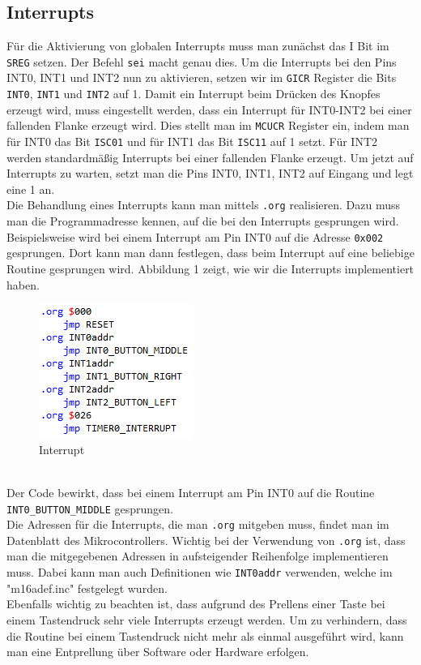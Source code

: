 \documentclass[]{article}
\begin{document}
\subsection{Interrupts}
Für die Aktivierung von globalen Interrupts muss man zunächst das I Bit im \texttt{SREG} setzen. Der Befehl \texttt{sei} macht genau dies. Um die Interrupts bei den Pins INT0, INT1 und INT2 nun zu aktivieren, setzen wir im \texttt{GICR} Register die Bits \texttt{INT0}, \texttt{INT1} und \texttt{INT2} auf 1. Damit ein Interrupt beim Drücken des Knopfes erzeugt wird, muss eingestellt werden, dass ein Interrupt für INT0-INT2 bei einer fallenden Flanke erzeugt wird. Dies stellt man im \texttt{MCUCR} Register ein, indem man für INT0 das Bit \texttt{ISC01} und für INT1 das Bit \texttt{ISC11} auf 1 setzt. Für INT2 werden standardmäßig Interrupts bei einer fallenden Flanke erzeugt. Um jetzt auf Interrupts zu warten, setzt man die Pins INT0, INT1, INT2 auf Eingang und legt eine 1 an. 
\\Die Behandlung eines Interrupts kann man mittels \texttt{.org} realisieren. Dazu muss man die Programmadresse kennen, auf die bei den Interrupts gesprungen wird. Beispielsweise wird bei einem Interrupt am Pin INT0 auf die Adresse \texttt{0x002} gesprungen. Dort kann man dann festlegen, dass beim Interrupt auf eine beliebige Routine gesprungen wird. Abbildung 1 zeigt, wie wir die Interrupts implementiert haben.
\begin{figure}[h]
	\centering
	\includegraphics[width=0.3\columnwidth]{Interrupt.png}
	\caption{Interrupt}
\end{figure}
\\Der Code bewirkt, dass bei einem Interrupt am Pin INT0 auf die Routine \texttt{INT0\_BUTTON\_MIDDLE} gesprungen.
\\Die Adressen für die Interrupts, die man \texttt{.org} mitgeben muss, findet man im Datenblatt des Mikrocontrollers. Wichtig bei der Verwendung von \texttt{.org} ist, dass man die mitgegebenen Adressen in aufsteigender Reihenfolge implementieren muss. Dabei kann man auch Definitionen wie \texttt{INT0addr} verwenden, welche im "m16adef.inc" festgelegt wurden.
\\Ebenfalls wichtig zu beachten ist, dass aufgrund des Prellens einer Taste bei einem Tastendruck sehr viele Interrupts erzeugt werden. Um zu verhindern, dass die Routine bei einem Tastendruck nicht mehr als einmal ausgeführt wird, kann man eine Entprellung über Software oder Hardware erfolgen. 
\end{document}
